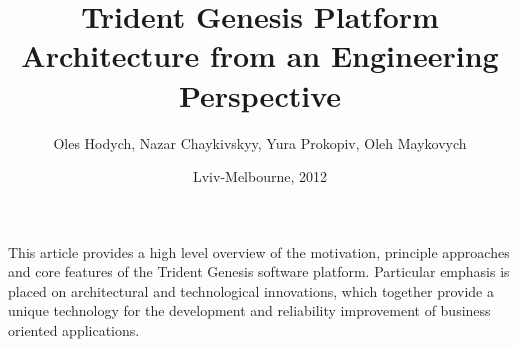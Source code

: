 \begin{titlepage}
\AddToShipoutPicture*{\BackgroundPic}
\title{Trident Genesis Platform Architecture from an Engineering Perspective}
\author{Oles Hodych, Nazar Chaykivskyy, Yura Prokopiv, Oleh Maykovych}
\date{Lviv-Melbourne, 2012}
\maketitle
\clearpage
\AddToShipoutPicture*{\BackgroundPic}
  This article provides a high level overview of the motivation, principle approaches and core features of the Trident Genesis software platform.
  Particular emphasis is placed on architectural and technological innovations, which together provide a unique technology for the development and reliability improvement of business oriented applications.

\clearpage
\AddToShipoutPicture*{\BackgroundPic}
\tableofcontents
\clearpage

\end{titlepage}